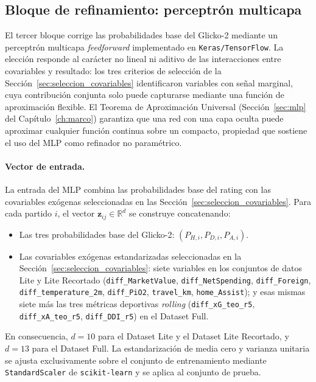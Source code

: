 \subsection{Bloque de refinamiento: perceptr\'on multicapa}
\label{subsec:mlp}

El tercer bloque corrige las probabilidades base del Glicko-2 mediante un perceptr\'on multicapa \emph{feedforward} implementado en \texttt{Keras/TensorFlow}. La elecci\'on responde al car\'acter no lineal ni aditivo de las interacciones entre covariables y resultado: los tres criterios de selecci\'on de la Secci\'on~\ref{sec:seleccion_covariables} identificaron variables con se\~nal marginal, cuya contribuci\'on conjunta solo puede capturarse mediante una funci\'on de aproximaci\'on flexible. El Teorema de Aproximaci\'on Universal (Secci\'on~\ref{sec:mlp} del Cap\'itulo~\ref{ch:marco}) garantiza que una red con una capa oculta puede aproximar cualquier funci\'on continua sobre un compacto, propiedad que sostiene el uso del MLP como refinador no param\'etrico.

\paragraph{Vector de entrada.} La entrada del MLP combina las probabilidades base del rating con las covariables ex\'ogenas seleccionadas en las Secci\'on~\ref{sec:seleccion_covariables}. Para cada partido $i$, el vector $\mathbf{z}_{ij} \in \mathbb{R}^{d}$ se construye concatenando:
\begin{itemize}
	\item Las tres probabilidades base del Glicko-2: $(P_{H,i}, P_{D,i}, P_{A,i})$.
	\item Las covariables ex\'ogenas estandarizadas seleccionadas en la Secci\'on~\ref{sec:seleccion_covariables}: siete variables en los conjuntos de datos Lite y Lite Recortado (\texttt{diff\_MarketValue}, \texttt{diff\_NetSpending}, \texttt{diff\_Foreign}, \texttt{diff\_temperature\_2m}, \texttt{diff\_PiO2}, \texttt{travel\_km}, \texttt{home\_Assist}); y esas mismas siete m\'as las tres m\'etricas deportivas \textit{rolling} (\texttt{diff\_xG\_teo\_r5}, \texttt{diff\_xA\_teo\_r5}, \texttt{diff\_DDI\_r5}) en el Dataset Full.
\end{itemize}
En consecuencia, $d = 10$ para el Dataset Lite y el Dataset Lite Recortado, y $d = 13$ para el Dataset Full. La estandarizaci\'on de media cero y varianza unitaria se ajusta exclusivamente sobre el conjunto de entrenamiento mediante \texttt{StandardScaler} de \texttt{scikit-learn} y se aplica al conjunto de prueba.

